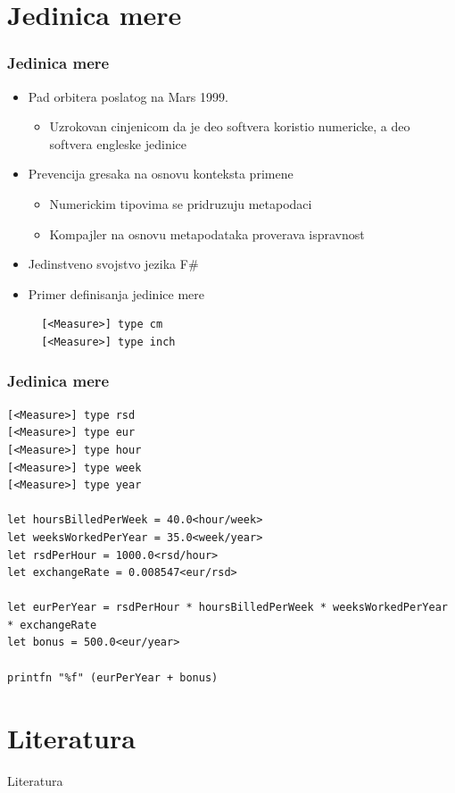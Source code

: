 \documentclass{beamer}
\begin{document}
\section{Jedinica mere}
\begin{frame}[fragile]
\frametitle{Jedinica mere}

\begin{itemize}
  \item Pad orbitera poslatog na Mars 1999.
  \begin{itemize}
  	\item Uzrokovan cinjenicom da je deo softvera koristio numericke, a deo softvera engleske jedinice
  \end{itemize}
  \item Prevencija gresaka na osnovu konteksta primene
  \begin{itemize}
  	\item Numerickim tipovima se pridruzuju metapodaci
  	\item Kompajler na osnovu metapodataka proverava ispravnost
  \end{itemize}
  \item Jedinstveno svojstvo jezika F\#
  \item Primer definisanja jedinice mere  
\begin{lstlisting}
  [<Measure>] type cm
  [<Measure>] type inch  
\end{lstlisting}
\end{itemize}
\end{frame}

\begin{frame}[fragile]
\frametitle{Jedinica mere}

\begin{lstlisting}
[<Measure>] type rsd
[<Measure>] type eur
[<Measure>] type hour
[<Measure>] type week
[<Measure>] type year

let hoursBilledPerWeek = 40.0<hour/week>
let weeksWorkedPerYear = 35.0<week/year>
let rsdPerHour = 1000.0<rsd/hour>
let exchangeRate = 0.008547<eur/rsd>

let eurPerYear = rsdPerHour * hoursBilledPerWeek * weeksWorkedPerYear * exchangeRate
let bonus = 500.0<eur/year>

printfn "%f" (eurPerYear + bonus)
\end{lstlisting}
\cite{progFs}
\end{frame}

\section{Literatura}

\begin{frame}{Literatura}



\end{frame}
\end{document}
